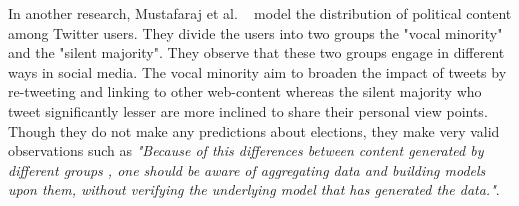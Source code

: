 In another research, Mustafaraj et al. ~\cite{mustafaraj2011vocal} model the distribution of political content among Twitter users. 
They divide the users into two groups the "vocal minority" and the "silent majority". 
They observe that these two groups engage in different ways in social media.
The vocal minority aim to broaden the impact of tweets by re-tweeting and linking to other web-content whereas the silent majority who tweet significantly lesser are more inclined to share their personal view points.
Though they do not make any predictions about elections, they make very valid observations such as 
\emph{"Because of this differences between content generated by different groups , one should be aware of aggregating data and building models upon them, without verifying the underlying model that has generated the data."}.

